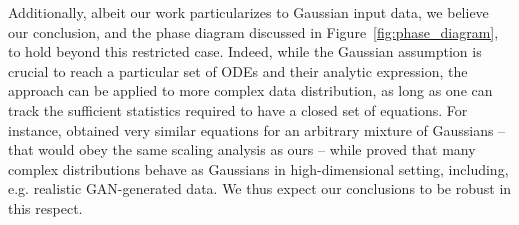 \documentclass[10pt]{article}
\begin{document}

    
Additionally, albeit our work particularizes to Gaussian input data, we believe our conclusion, and the phase diagram discussed in Figure~\ref{fig:phase_diagram}, to hold beyond this restricted case. Indeed, while the Gaussian assumption is crucial to reach a particular set of ODEs and their analytic expression, the approach can be applied to more complex data distribution, as long as one can track the sufficient statistics required to have a closed set of equations. For instance, \cite{refinetti2021classifying} obtained very similar equations for an arbitrary mixture of Gaussians -- that would obey the same scaling analysis as ours -- while  \cite{goldt2020gaussian,hu2020universality,montanari2022universality} proved that many complex distributions behave as Gaussians in high-dimensional setting, including, e.g. realistic GAN-generated data. We thus expect our conclusions to be robust in this respect.
\end{document}

